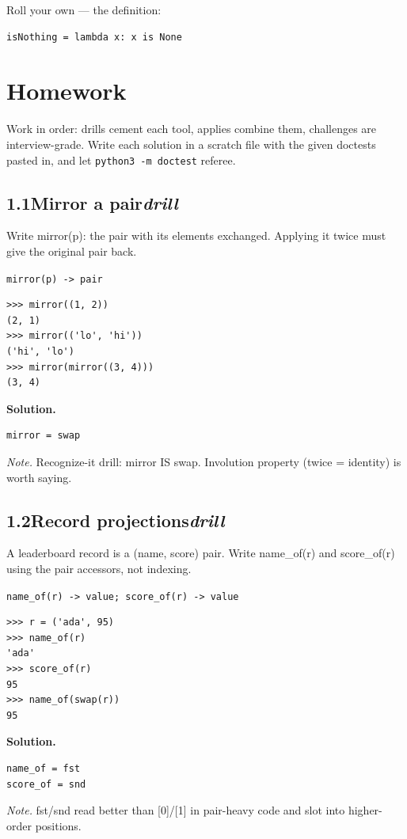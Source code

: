 \documentclass[10pt,letterpaper]{book}
\begin{document}
Roll your own --- the definition:

\begin{lstlisting}[style=ex]
isNothing = lambda x: x is None
\end{lstlisting}

\section{Homework}
Work in order: drills cement each tool, applies combine them,
challenges are interview-grade. Write each solution in a scratch file with
the given doctests pasted in, and let \texttt{python3 -m doctest} referee.
\subsection*{1.1\quad Mirror a pair\hfill\textnormal{\textit{drill}}}
Write mirror(p): the pair with its elements exchanged. Applying it twice must give the original pair back.

\noindent\texttt{mirror(p) -> pair}
\begin{lstlisting}[style=ex]
>>> mirror((1, 2))
(2, 1)
>>> mirror(('lo', 'hi'))
('hi', 'lo')
>>> mirror(mirror((3, 4)))
(3, 4)
\end{lstlisting}
\noindent\textbf{Solution.}
\begin{lstlisting}[style=code]
mirror = swap
\end{lstlisting}
\noindent\textit{Note.} Recognize-it drill: mirror IS swap. Involution property (twice = identity) is worth saying.

\subsection*{1.2\quad Record projections\hfill\textnormal{\textit{drill}}}
A leaderboard record is a (name, score) pair. Write name\_of(r) and score\_of(r) using the pair accessors, not indexing.

\noindent\texttt{name\_of(r) -> value; score\_of(r) -> value}
\begin{lstlisting}[style=ex]
>>> r = ('ada', 95)
>>> name_of(r)
'ada'
>>> score_of(r)
95
>>> name_of(swap(r))
95
\end{lstlisting}
\noindent\textbf{Solution.}
\begin{lstlisting}[style=code]
name_of = fst
score_of = snd
\end{lstlisting}
\noindent\textit{Note.} fst/snd read better than [0]/[1] in pair-heavy code and slot into higher-order positions.
\end{document}
